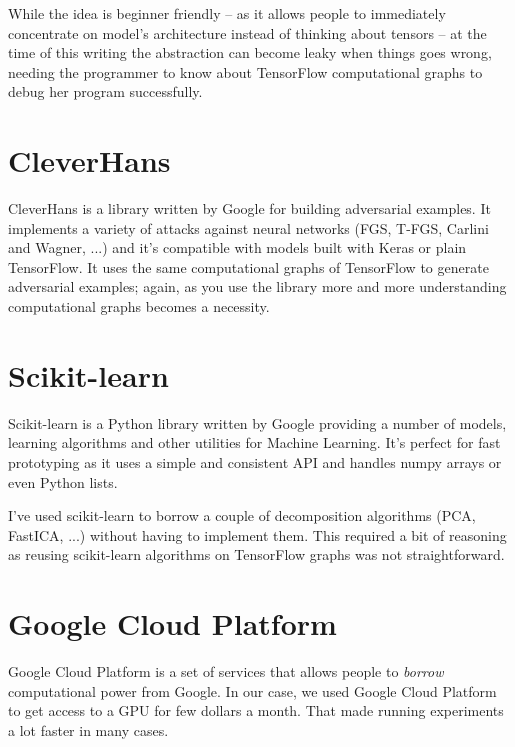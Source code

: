 While the idea is beginner friendly -- as it allows people to
immediately concentrate on model's architecture instead of thinking
about tensors -- at the time of this writing the abstraction can become
leaky when things goes wrong, needing the programmer to know about
TensorFlow computational graphs to debug her program successfully.

\section{CleverHans}
\label{sec:cleverhans}

CleverHans is a library written by Google for building adversarial
examples. It implements a variety of attacks against neural networks
(FGS, T-FGS, Carlini and Wagner, ...) and it's compatible with models
built with Keras or plain TensorFlow. It uses the same computational
graphs of TensorFlow to generate adversarial examples; again, as you
use the library more and more understanding computational graphs
becomes a necessity.

\section{Scikit-learn}
\label{sec:sklearn}

Scikit-learn is a Python library written by Google providing a number
of models, learning algorithms and other utilities for Machine
Learning. It's perfect for fast prototyping as it uses a simple and
consistent API and handles numpy arrays or even Python lists.

I've used scikit-learn to borrow a couple of decomposition algorithms
(PCA, FastICA, ...) without having to implement them. This required a
bit of reasoning as reusing scikit-learn algorithms on TensorFlow
graphs was not straightforward.

\section{Google Cloud Platform}
\label{sec:google-cloud-platform}

Google Cloud Platform is a set of services that allows people to
\emph{borrow} computational power from Google. In our case, we used
Google Cloud Platform to get access to a GPU for few dollars a month.
That made running experiments a lot faster in many cases.
